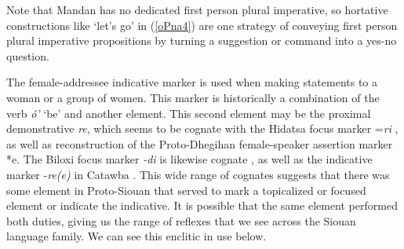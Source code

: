 Note that Mandan has no dedicated first person plural imperative, so hortative constructions like `let's go' in (\ref{oPna4}) are one strategy of conveying first person plural imperative propositions by turning a suggestion or command into a yes-no question.


The female-addressee indicative marker is used when making statements to a woman or a group of women. This marker is historically a combination of the verb \textit{ó'} `be' and another element. This second element may be the proximal demonstrative \textit{re}, which seems to be cognate with the Hidatsa focus marker =\textit{ri} \citep[70]{boyle2007}, as well as  reconstruction of the Proto-Dhegihan female-speaker assertion marker *{\dh}e. The Biloxi focus marker \textit{-di} is likewise cognate \citep[39]{torres2010}, as well as the indicative marker -\textit{re(e)} in Catawba \citep[53]{rudes2007a}. This wide range of cognates suggests that there was some element in Proto-Siouan that served to mark a topicalized or focused element or indicate the indicative. It is possible that the same element performed both duties, giving us the range of reflexes that we see across the Siouan language family. We can see this enclitic in use below.

